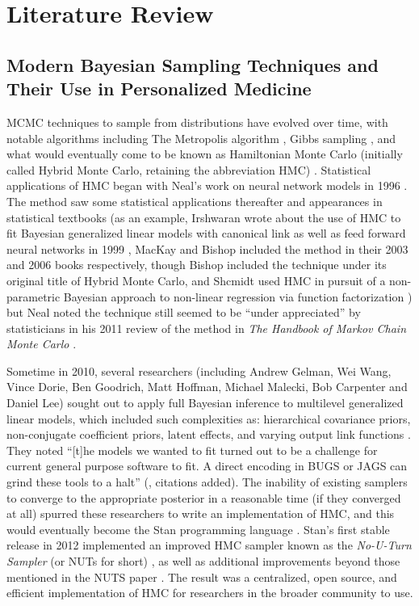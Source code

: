 \chapter{Literature Review}

\section{Modern Bayesian Sampling Techniques and Their Use in Personalized Medicine}

MCMC techniques to sample from distributions have evolved over time, with notable algorithms including The Metropolis algorithm \cite{metropolis1953equation},  Gibbs sampling \cite{geman1984stochastic}, and what would eventually come to be known as Hamiltonian Monte Carlo (initially called Hybrid Monte Carlo, retaining the abbreviation HMC) \cite{duane1987hybrid}.  Statistical applications of HMC began with Neal's work on neural network models in 1996 \cite{Neal1996-vn, brooks2011handbook}. The method saw some statistical applications thereafter and appearances in statistical textbooks (as an example, Irshwaran wrote about the use of HMC to fit Bayesian generalized linear models with canonical link as well as feed forward neural networks in 1999 \cite{ishwaran1999applications}, MacKay \cite[Chapter~30]{mackay2003information} and Bishop \cite[Chapter~11]{Bishop2006pattern} included the method in their 2003 and 2006 books respectively,  though Bishop included the technique under its original title of Hybrid Monte Carlo, and Shcmidt used HMC in pursuit of a non-parametric Bayesian approach to non-linear regression via function factorization \cite{schmidt2009function}) but Neal noted the technique still seemed to be ``under appreciated'' by statisticians in his 2011 review of the method in \textit{The Handbook of Markov Chain Monte Carlo} \cite[Chapter~5]{brooks2011handbook}.

Sometime in 2010, several researchers (including Andrew Gelman, Wei Wang, Vince Dorie, Ben Goodrich, Matt Hoffman, Michael Malecki, Bob Carpenter and Daniel Lee) sought out to apply full Bayesian inference to multilevel generalized linear models, which included such complexities as: hierarchical covariance priors, non-conjugate coefficient priors, latent effects, and varying output link functions \cite{stan2012}.  They noted ``[t]he models we wanted to fit turned out to be a challenge for current general purpose software to fit. A direct encoding in BUGS \cite{lunn2000winbugs} or JAGS \cite{plummer2003jags} can grind these tools to a
halt'' (\cite{stan2012}, citations added).  The inability of existing samplers to converge to the appropriate posterior in a reasonable time (if they converged at all) spurred these researchers to write an implementation of HMC, and this would eventually become the Stan programming language \cite{stan2012}.  Stan's first stable release in 2012 \cite{stan2012} implemented an improved HMC sampler known as the \textit{No-U-Turn Sampler} (or NUTs for short) \cite{hoffman2014no}, as well as additional improvements beyond those mentioned in the NUTS paper \cite{stan2012}.  The result was a centralized, open source, and efficient implementation of HMC for researchers in the broader community to use.

